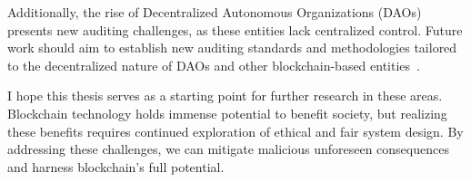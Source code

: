 Additionally, the rise of Decentralized Autonomous Organizations (DAOs) presents new auditing challenges, as these entities lack centralized control. Future work should aim to establish new auditing standards and methodologies tailored to the decentralized nature of DAOs and other blockchain-based entities~\cite{tan2023open}.


\vspace{10mm}

I hope this thesis serves as a starting point for further research in these areas. Blockchain technology holds immense potential to benefit society, but realizing these benefits requires continued exploration of ethical and fair system design. By addressing these challenges, we can mitigate malicious unforeseen consequences and harness blockchain's full potential.


